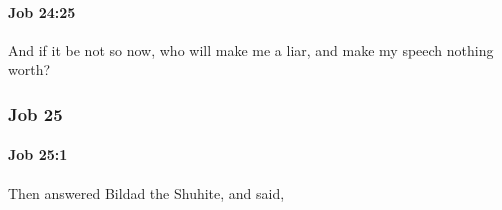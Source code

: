 		\paragraph{Job 24:25} %
			\label{JOB-24-25}

			And if it be not so now, who will make me a liar, and make my speech nothing worth?

	\subsubsection{Job 25} %
		\label{JOB-25}

		\paragraph{Job 25:1} %
			\label{JOB-25-1}

			Then answered Bildad the Shuhite, and said,


